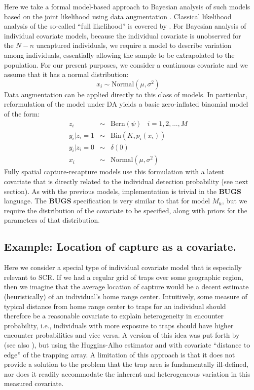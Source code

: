 Here we take a formal model-based approach to Bayesian analysis of
such models based on the joint likelihood
using data augmentation \citep{royle:2009}. Classical
likelihood analysis of the so-called ``full likelihood'' is covered
 by \citet{borchers_etal:2002}.  For Bayesian analysis of
individual covariate models, because the individual covariate is
unobserved for the $N-n$ uncaptured individuals, we require a model to
describe variation among individuals, essentially allowing the sample
to be extrapolated to the population.  For our present purposes, we
consider a continuous covariate and we assume that it has a normal
distribution:
\[
x_{i} \sim \mbox{Normal}(\mu,\sigma^{2})
\]
Data augmentation can be applied directly to this class of models. In
particular, reformulation of the model under DA yields a basic
zero-inflated binomial model of the form:
\begin{eqnarray*}
z_{i} &\sim& \mbox{Bern}(\psi) \; \; \; i=1,2,\ldots,M\\
y_{i}|{z_{i}\! =\! 1} &\sim& \mbox{Bin}(K,p_{i}(x_{i})) \\
y_{i} |{ z_{i}\! =\! 0} &\sim& \delta(0)  \\
x_{i} & \sim & \mbox{Normal}(\mu,\sigma^{2})
\end{eqnarray*}
Fully spatial capture-recapture models use this
formulation with a latent covariate that is directly related to the
individual detection probability (see next section). As with the
previous models, implementation is trivial in the {\bf BUGS} language. The
{\bf BUGS} specification is very similar to that for model $M_h$, but we
require the distribution of the covariate to be specified, along with
priors for the parameters of that distribution.


\subsection{Example: Location of capture as a covariate.}

Here we consider a special type of individual covariate model that is
especially relevant to SCR.
If we had a regular grid of traps over some geographic region,
then we imagine that the average location of capture would be a decent
estimate (heuristically) of an individual's home range center.
Intuitively, some measure of typical distance from home range center to
traps for an individual should therefore be a reasonable  covariate to explain
heterogeneity in encounter probability, i.e., individuals with more
exposure to traps should have higher encounter probabilities and vice
versa.  A version of this idea was put forth by
\citet{boulanger_mclellan:2001} (see also \citet{ivan:2012}), but
using the Huggins-Alho estimator and with covariate ``distance to
edge'' of the trapping array. A limitation of this  approach is
that it does not provide a solution to the problem that the trap area
is fundamentally ill-defined, nor does it readily accommodate the
inherent and heterogeneous variation in this measured covariate.


